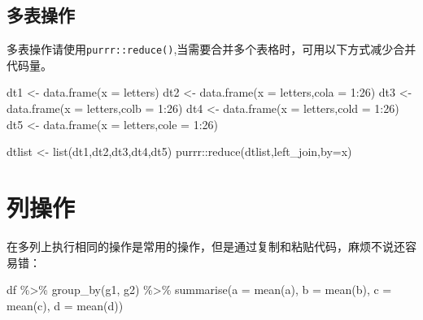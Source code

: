 \documentclass[
]{book}
\newenvironment{Shaded}{\begin{snugshade}}{\end{snugshade}}
\newcommand{\AttributeTok}[1]{\textcolor[rgb]{0.77,0.63,0.00}{#1}}
\newcommand{\DecValTok}[1]{\textcolor[rgb]{0.00,0.00,0.81}{#1}}
\newcommand{\FunctionTok}[1]{\textcolor[rgb]{0.00,0.00,0.00}{#1}}
\newcommand{\NormalTok}[1]{#1}
\newcommand{\OtherTok}[1]{\textcolor[rgb]{0.56,0.35,0.01}{#1}}
\newcommand{\SpecialCharTok}[1]{\textcolor[rgb]{0.00,0.00,0.00}{#1}}
\newcommand{\StringTok}[1]{\textcolor[rgb]{0.31,0.60,0.02}{#1}}
\begin{document}
\hypertarget{ux591aux8868ux64cdux4f5c}{%
\subsection{多表操作}\label{ux591aux8868ux64cdux4f5c}}

多表操作请使用\texttt{purrr::reduce()},当需要合并多个表格时，可用以下方式减少合并代码量。

\begin{Shaded}
\begin{Highlighting}[]
\NormalTok{dt1 }\OtherTok{\textless{}{-}} \FunctionTok{data.frame}\NormalTok{(}\AttributeTok{x =}\NormalTok{ letters)}
\NormalTok{dt2 }\OtherTok{\textless{}{-}} \FunctionTok{data.frame}\NormalTok{(}\AttributeTok{x =}\NormalTok{ letters,}\AttributeTok{cola =} \DecValTok{1}\SpecialCharTok{:}\DecValTok{26}\NormalTok{)}
\NormalTok{dt3 }\OtherTok{\textless{}{-}} \FunctionTok{data.frame}\NormalTok{(}\AttributeTok{x =}\NormalTok{ letters,}\AttributeTok{colb =} \DecValTok{1}\SpecialCharTok{:}\DecValTok{26}\NormalTok{)}
\NormalTok{dt4 }\OtherTok{\textless{}{-}} \FunctionTok{data.frame}\NormalTok{(}\AttributeTok{x =}\NormalTok{ letters,}\AttributeTok{cold =} \DecValTok{1}\SpecialCharTok{:}\DecValTok{26}\NormalTok{)}
\NormalTok{dt5 }\OtherTok{\textless{}{-}} \FunctionTok{data.frame}\NormalTok{(}\AttributeTok{x =}\NormalTok{ letters,}\AttributeTok{cole =} \DecValTok{1}\SpecialCharTok{:}\DecValTok{26}\NormalTok{)}

\NormalTok{dtlist }\OtherTok{\textless{}{-}} \FunctionTok{list}\NormalTok{(dt1,dt2,dt3,dt4,dt5)}
\NormalTok{purrr}\SpecialCharTok{::}\FunctionTok{reduce}\NormalTok{(dtlist,left\_join,}\AttributeTok{by=}\StringTok{\textquotesingle{}x\textquotesingle{}}\NormalTok{)}
\end{Highlighting}
\end{Shaded}

\hypertarget{ux5217ux64cdux4f5c}{%
\section{列操作}\label{ux5217ux64cdux4f5c}}

在多列上执行相同的操作是常用的操作，但是通过复制和粘贴代码，麻烦不说还容易错：

\begin{Shaded}
\begin{Highlighting}[]
\NormalTok{df }\SpecialCharTok{\%\textgreater{}\%} 
  \FunctionTok{group\_by}\NormalTok{(g1, g2) }\SpecialCharTok{\%\textgreater{}\%} 
  \FunctionTok{summarise}\NormalTok{(}\AttributeTok{a =} \FunctionTok{mean}\NormalTok{(a), }\AttributeTok{b =} \FunctionTok{mean}\NormalTok{(b), }\AttributeTok{c =} \FunctionTok{mean}\NormalTok{(c), }\AttributeTok{d =} \FunctionTok{mean}\NormalTok{(d))}
\end{Highlighting}
\end{Shaded}
\end{document}
